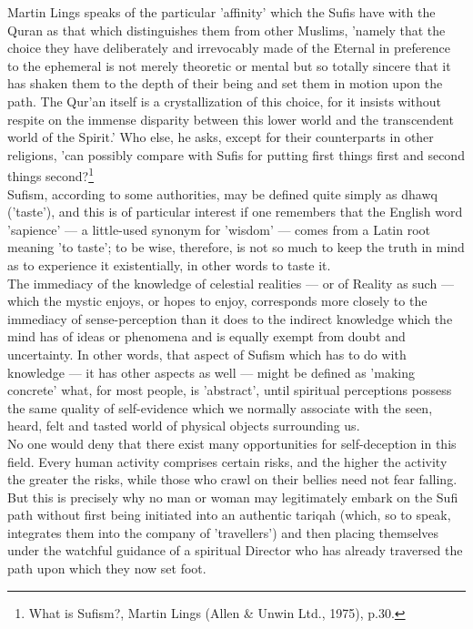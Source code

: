 \documentclass[11pt, b5paper, twoside]{book}
\begin{document}
Martin Lings speaks of the particular 'affinity' which the Sufis have with the Quran as that which 
distinguishes them from other Muslims, 'namely that the choice they have deliberately and irrevocably 
made of the Eternal in preference to the ephemeral is not merely theoretic or mental but so totally 
sincere that it has shaken them to the depth of their being and set them in motion upon the path. The 
Qur'an itself is a crystallization of this choice, for it insists without respite on the immense 
disparity between this lower world and the transcendent world of the Spirit.' Who else, he asks, 
except for their counterparts in other religions, 'can possibly compare with Sufis for putting first 
things first and second things second?\footnote{What is Sufism?, Martin Lings (Allen \& Unwin Ltd., 1975), p.30.} \\

Sufism, according to some authorities, may be defined quite simply as dhawq ('taste'), and this is of 
particular interest if one remembers that the English word 'sapience' --- a little-used synonym for 
'wisdom' --- comes from a Latin root meaning 'to taste'; to be wise, therefore, is not so much to keep 
the truth in mind as to experience it existentially, in other words to taste it. \\

The immediacy of the knowledge of celestial realities --- or of Reality as such --- which the mystic 
enjoys, or hopes to enjoy, corresponds more closely to the immediacy of sense-perception than it does 
to the indirect knowledge which the mind has of ideas or phenomena and is equally exempt from doubt 
and uncertainty. In other words, that aspect of Sufism which has to do with knowledge --- it has other 
aspects as well --- might be defined as 'making concrete' what, for most people, is 'abstract', until 
spiritual perceptions possess the same quality of self-evidence which we normally associate with the 
seen, heard, felt and tasted world of physical objects surrounding us. \\

No one would deny that there exist many opportunities for self\hyp{}deception in this field. Every human 
activity comprises certain risks, and the higher the activity the greater the risks, while those who 
crawl on their bellies need not fear falling. But this is precisely why no man or woman may 
legitimately embark on the Sufi path without first being initiated into an authentic tariqah (which, 
so to speak, integrates them into the company of 'travellers') and then placing themselves under the 
watchful guidance of a spiritual Director who has already traversed the path upon which they now set 
foot. \\
\end{document}
